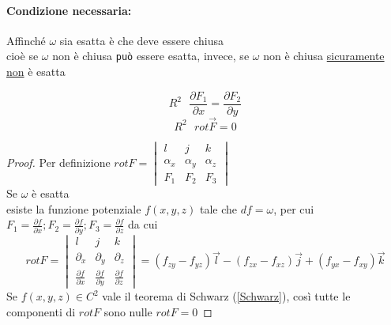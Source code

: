 \paragraph{Condizione necessaria:} Affinché $\omega$ sia esatta è che deve
essere chiusa\\
cioè se $\omega$ non è chiusa \texttt{può} essere esatta,
invece, se $\omega$ non è chiusa \underline{sicuramente \color{red} non} è esatta
\begin{multicols}{2}
	\begin{equation*}
		R^2\text{ }\frac{\partial F_1}{\partial x}=\frac{\partial F_2}{\partial y}
	\end{equation*}
	\begin{equation*}
		R^2\text{ } rot \vec{F}=0
	\end{equation*}
\end{multicols}
\begin{proof}
	Per definizione $rot F=\begin{vmatrix}
		l & j & k \\
		\alpha_x & \alpha_y & \alpha_z\\
		F_1 & F_2 & F_3
	\end{vmatrix}$\\
	Se $\omega$ è esatta\\
	esiste la funzione potenziale $f(x,y,z)$ tale che $df=\omega$, per cui
	$F_1=\frac{\partial f}{\partial x};F_2=\frac{\partial f}{\partial y};
	F_3=\frac{\partial f}{\partial z}$ da cui
	\begin{equation*}
		rot F=\begin{vmatrix}
			l & j & k\\
			\partial_x &\partial_y & \partial_z \\
			\frac{\partial f}{\partial x} &\frac{\partial f}{\partial
			y} & \frac{\partial f}{\partial z}
		\end{vmatrix}=(f_{zy}-f_{yz})\vec{l} - (f_{zx}-f_{xz})\vec{j}+
		(f_{yx}-f_{xy})\vec{k}
	\end{equation*}
	Se $f(x,y,z)\in C^2$ vale il teorema di Schwarz (\ref{Schwarz}), così tutte
	le componenti di $rot F$ sono nulle $rot F = 0$
\end{proof}

